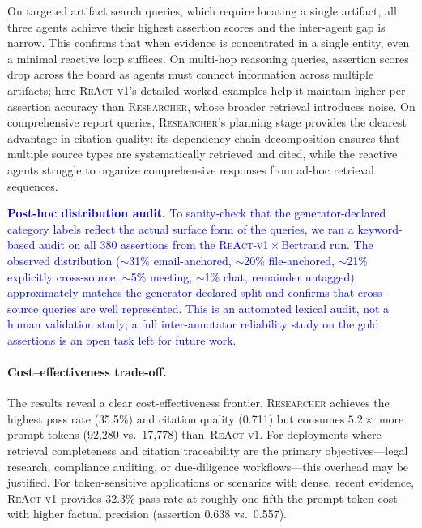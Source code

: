 \noindent On targeted artifact search queries, which require locating a single artifact, all three agents achieve their highest assertion scores and the inter-agent gap is narrow. This confirms that when evidence is concentrated in a single entity, even a minimal reactive loop suffices. On multi-hop reasoning queries, assertion scores drop across the board as agents must connect information across multiple artifacts; here \textsc{ReAct-v1}'s detailed worked examples help it maintain higher per-assertion accuracy than \textsc{Researcher}, whose broader retrieval introduces noise. On comprehensive report queries, \textsc{Researcher}'s planning stage provides the clearest advantage in citation quality: its dependency-chain decomposition ensures that multiple source types are systematically retrieved and cited, while the reactive agents struggle to organize comprehensive responses from ad-hoc retrieval sequences.

\textcolor{blue}{\textbf{Post-hoc distribution audit.} To sanity-check that the generator-declared category labels reflect the actual surface form of the queries, we ran a keyword-based audit on all 380 assertions from the \textsc{ReAct-v1}\,$\times$\,Bertrand run. The observed distribution ($\sim$31\% email-anchored, $\sim$20\% file-anchored, $\sim$21\% explicitly cross-source, $\sim$5\% meeting, $\sim$1\% chat, remainder untagged) approximately matches the generator-declared split and confirms that cross-source queries are well represented. This is an automated lexical audit, not a human validation study; a full inter-annotator reliability study on the gold assertions is an open task left for future work.}

\paragraph{Cost--effectiveness trade-off.}
\label{sec:cost-tradeoff}

The results reveal a clear cost-effectiveness frontier. \textsc{Researcher} achieves the highest pass rate (35.5\%) and citation quality (0.711) but consumes $5.2\times$ more prompt tokens (92{,}280 vs.\ 17{,}778) than~\textsc{ReAct-v1}. For deployments where retrieval completeness and citation traceability are the primary objectives---legal research, compliance auditing, or due-diligence workflows---this overhead may be justified. For token-sensitive applications or scenarios with dense, recent evidence, \textsc{ReAct-v1} provides 32.3\% pass rate at roughly one-fifth the prompt-token cost with higher factual precision (assertion 0.638 vs.\ 0.557).

